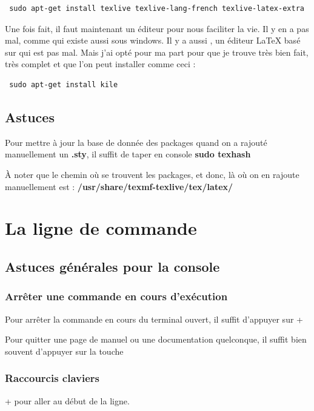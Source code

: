 \documentclass[a4paper,twoside]{article}
\begin{document}
\begin{verbatim}
 sudo apt-get install texlive texlive-lang-french texlive-latex-extra
\end{verbatim}

Une fois fait, il faut maintenant un éditeur pour nous faciliter la vie. Il y en a pas mal, comme  qui existe aussi sous windows. Il y a aussi , un éditeur \LaTeX{} basé sur  qui est pas mal. Mais j'ai opté pour ma part pour  que je trouve très bien fait, très complet et que l'on peut installer comme ceci :
\begin{verbatim}
 sudo apt-get install kile
\end{verbatim}

\subsection{Astuces}

Pour mettre à jour la base de donnée des packages quand on a rajouté manuellement un \textbf{.sty}, il suffit de taper en console \textbf{sudo texhash}

À noter que le chemin où se trouvent les packages, et donc, là où on en rajoute manuellement est : \textbf{/usr/share/texmf-texlive/tex/latex/}

\section{La ligne de commande}
\subsection{Astuces générales pour la console}
\subsubsection{Arrêter une commande en cours d'exécution}
Pour arrêter la commande en cours du terminal ouvert, il suffit d'appuyer sur + 

Pour quitter une page de manuel ou une documentation quelconque, il suffit bien souvent d'appuyer sur la touche 

\subsubsection{Raccourcis claviers}
 +  pour aller au début de la ligne.
\end{document}
